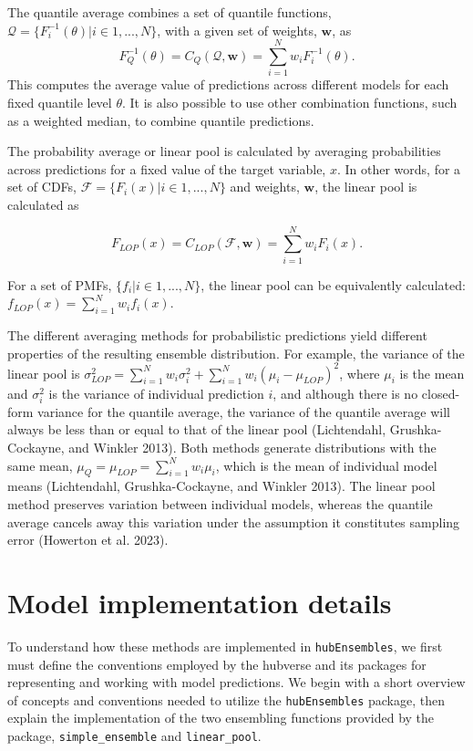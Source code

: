 \documentclass[
]{article}
\begin{document}
The quantile average combines a set of quantile functions,
\(\mathcal{Q} = \{F_i^{-1}(\theta)| i \in 1,...,N \}\), with a given set
of weights, \(\pmb{w}\), as \[
F^{-1}_Q(\theta) = C_Q(\mathcal{Q}, \pmb{w}) = \sum_{i = 1}^Nw_iF^{-1}_i(\theta).
\]This computes the average value of predictions across different models
for each fixed quantile level \(\theta\). It is also possible to use
other combination functions, such as a weighted median, to combine
quantile predictions.

The probability average or linear pool is calculated by averaging
probabilities across predictions for a fixed value of the target
variable, \(x\). In other words, for a set of CDFs,
\(\mathcal{F} = \{F_i(x)| i \in 1,...,N \}\) and weights, \(\pmb{w}\),
the linear pool is calculated as

\[
F_{LOP}(x) = C_{LOP}(\mathcal{F}, \pmb{w}) = \sum_{i = 1}^Nw_iF_i(x). 
\]

For a set of PMFs, \(\{f_i|i \in 1, ..., N\}\), the linear pool can be
equivalently calculated: \(f_{LOP}(x) = \sum_{i = 1}^N w_i f_i(x)\).

The different averaging methods for probabilistic predictions yield
different properties of the resulting ensemble distribution. For
example, the variance of the linear pool is
\(\sigma^2_{LOP} = \sum_{i=1}^Nw_i\sigma_i^2 + \sum_{i=1}^Nw_i(\mu_i-\mu_{LOP})^2\),
where \(\mu_i\) is the mean and \(\sigma^2_i\) is the variance of
individual prediction \(i\), and although there is no closed-form
variance for the quantile average, the variance of the quantile average
will always be less than or equal to that of the linear pool
(Lichtendahl, Grushka-Cockayne, and Winkler 2013). Both methods generate
distributions with the same mean,
\(\mu_Q = \mu_{LOP} = \sum_{i=1}^Nw_i\mu_i\), which is the mean of
individual model means (Lichtendahl, Grushka-Cockayne, and Winkler
2013). The linear pool method preserves variation between individual
models, whereas the quantile average cancels away this variation under
the assumption it constitutes sampling error (Howerton et al. 2023).

\section{Model implementation details}\label{sec-implementation}

To understand how these methods are implemented in
\texttt{hubEnsembles}, we first must define the conventions employed by
the hubverse and its packages for representing and working with model
predictions. We begin with a short overview of concepts and conventions
needed to utilize the \texttt{hubEnsembles} package, then explain the
implementation of the two ensembling functions provided by the package,
\texttt{simple\_ensemble} and \texttt{linear\_pool}.
\end{document}

